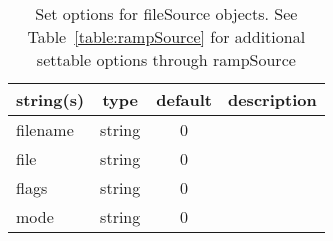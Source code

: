 \begin{table}[ht]
\centering
\begin{tabular}{p{5cm} c c p{7cm}}
\hline
string(s) & type & default & description \\
\hline
filename & string & 0 & \\
file & string & 0 & \\
flags & string & 0 & \\
mode & string & 0 & \\
\hline
\end{tabular}
\caption{Set options for fileSource objects. See Table~\ref{table:rampSource} for additional settable options through rampSource}
\label{table:fileSource}
\end{table}
